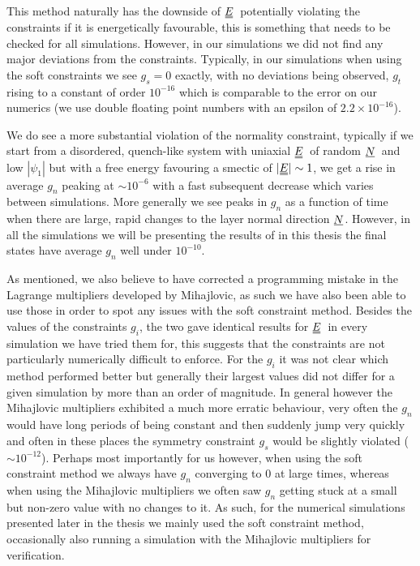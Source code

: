 \documentclass[12pt]{article}
\newcommand{\suf}[2]{\stackunder[0.5pt]{\stackunder[1pt]{\ensuremath{#1}}{\rule{\widthof{\ensuremath{#2}}*\real{0.9}}{.1ex}}}{}}
\newcommand{\duf}[2]{\stackunder[0.5pt]{\stackunder[0.8pt]{\stackunder[1pt]{\ensuremath{#1}}{\rule{\widthof{\ensuremath{#2}}*\real{0.9}}{.1ex}}}{\rule{\widthof{\ensuremath{#2}}*\real{0.9}}{.1ex}}}{}}
\newcommand{\su}[1]{\suf{#1}{#1}}
\newcommand{\du}[1]{\duf{#1}{#1}}
\newcommand{\NN}{\ensuremath{\su{N}}}
\newcommand{\EE}{\ensuremath{\du{E}}}
\begin{document}
    This method naturally has the downside of \EE\ potentially violating the constraints if it is energetically favourable, this is something that needs to be checked for all simulations.
    However, in our simulations we did not find any major deviations from the constraints.
    Typically, in our simulations when using the soft constraints we see $g_s = 0$ exactly, with no deviations being observed, $g_t$ rising to a constant of order $10^{-16}$ which is comparable to the error on our numerics (we use double floating point numbers with an epsilon of $2.2\times10^{-16}$).

    We do see a more substantial violation of the normality constraint, typically if we start from a disordered, quench-like system with uniaxial \EE\ of random \NN\ and low $|\psi_1|$ but with a free energy favouring a smectic of $|\EE|\sim1$, we get a rise in average $g_n$ peaking at ${\sim}10^{-6}$ with a fast subsequent decrease which varies between simulations.
    More generally we see peaks in $g_n$ as a function of time when there are large, rapid changes to the layer normal direction \NN.
    However, in all the simulations we will be presenting the results of in this thesis the final states have average $g_n$ well under $10^{-10}$.

    As mentioned, we also believe to have corrected a programming mistake in the Lagrange multipliers developed by Mihajlovic, as such we have also been able to use those in order to spot any issues with the soft constraint method.
    Besides the values of the constraints $g_i$, the two gave identical results for \EE\ in every simulation we have tried them for, this suggests that the constraints are not particularly numerically difficult to enforce.
    For the $g_i$ it was not clear which method performed better but generally their largest values did not differ for a given simulation by more than an order of magnitude.
    In general however the Mihajlovic multipliers exhibited a much more erratic behaviour, very often the $g_n$ would have long periods of being constant and then suddenly jump very quickly and often in these places the symmetry constraint $g_s$ would be slightly violated (${\sim}10^{-12}$).
    Perhaps most importantly for us however, when using the soft constraint method we always have $g_n$ converging to 0 at large times, whereas when using the Mihajlovic multipliers we often saw $g_n$ getting stuck at a small but non-zero value with no changes to it.
    As such, for the numerical simulations presented later in the thesis we mainly used the soft constraint method, occasionally also running a simulation with the Mihajlovic multipliers for verification.
\end{document}
